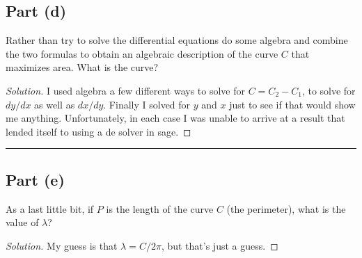 \documentclass[letterpaper, 12pt]{amsart}
\theoremstyle{definition}  							%
\begin{document}
		\subsection*{Part (d)}
		Rather than try to solve the differential equations do some algebra and combine the two formulas to obtain an algebraic description of the curve $C$ that maximizes area. 
		What is the curve?

		\begin{proof}[Solution]
		I used algebra a few different ways to solve for $C = C_{2}-C_{1}$, to solve for $dy/dx$ as well as $dx/dy$.
		Finally I solved for $y$ and $x$ just to see if that would show me anything.
		Unfortunately, in each case I was unable to arrive at a result that lended itself to using a de solver in sage.
		\end{proof}
		\vspace*{2mm}
		\hrule
		\vspace*{2mm}

		\subsection*{Part (e)}
		As a last little bit, if $P$ is the length of the curve $C$ (the perimeter), what is the value of $\lambda$?

		\begin{proof}[Solution]
		My guess is that $\lambda = C/2\pi$, but that's just a guess.
		\end{proof}
\end{document}
